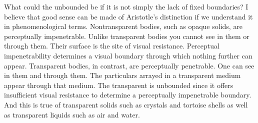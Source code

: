 What could the unbounded be if it is not simply the lack of fixed boundaries? I believe that good sense can be made of Aristotle's distinction if we understand it in phenomenological terms. Nontransparent bodies, such as opaque solids, are perceptually impenetrable. Unlike transparent bodies you cannot see in them or through them. Their surface is the site of visual resistance. Perceptual impenetrability determines a visual boundary through which nothing further can appear. Transparent bodies, in contrast, are perceptually penetrable. One can see in them and through them. The particulars arrayed in a transparent medium appear through that medium. The transparent is unbounded since it offers insufficient visual resistance to determine a perceptually impenetrable boundary. And this is true of transparent solids such as crystals and tortoise shells as well as transparent liquids such as air and water.

